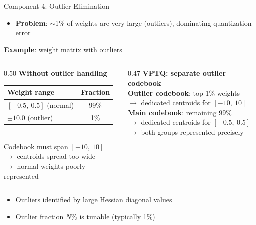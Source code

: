 \begin{frame}{Component 4: Outlier Elimination}
  \begin{itemize}
    \item \textbf{Problem}: $\sim$1\% of weights are very large (outliers), dominating quantization error
  \end{itemize}
  \vspace{0.3em}
  \textbf{Example}: weight matrix with outliers

  \vspace{0.3em}
  \begin{columns}[T]
    \begin{column}{0.50\textwidth}
      \textbf{Without outlier handling}\\[0.3em]
      \small
      \begin{tabular}{lc}
        Weight range & Fraction \\
        \midrule
        $[-0.5,\ 0.5]$ (normal) & 99\% \\
        $\pm 10.0$ (outlier) & 1\% \\
      \end{tabular}\\[0.4em]
      Codebook must span $[-10,\ 10]$\\
      $\rightarrow$ centroids spread too wide\\
      \textcolor{mycolor}{$\rightarrow$ normal weights poorly represented}
    \end{column}
    \begin{column}{0.47\textwidth}
      \textbf{VPTQ: separate outlier codebook}\\[0.3em]
      \small
      \textbf{Outlier codebook}: top 1\% weights\\
      $\rightarrow$ dedicated centroids for $[-10,\ 10]$\\[0.3em]
      \textbf{Main codebook}: remaining 99\%\\
      $\rightarrow$ dedicated centroids for $[-0.5,\ 0.5]$\\[0.3em]
      \textcolor{mycolor!70!black}{$\rightarrow$ both groups represented precisely}
    \end{column}
  \end{columns}
  \vspace{0.4em}
  \begin{itemize}
    \item Outliers identified by large Hessian diagonal values
    \item Outlier fraction $N\%$ is tunable (typically 1\%)
  \end{itemize}
\end{frame}

